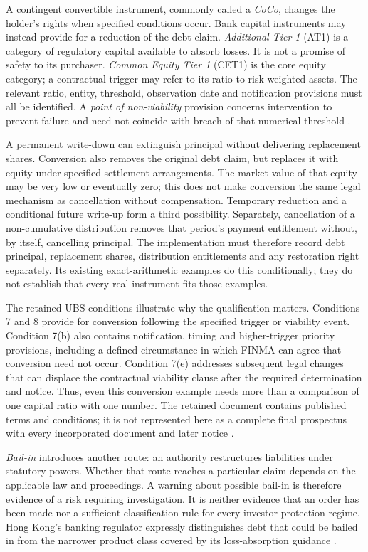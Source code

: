 \documentclass[12pt,a4paper,oneside,openany]{book}
\begin{document}
A contingent convertible instrument, commonly called a \emph{CoCo}, changes the
holder's rights when specified conditions occur. Bank capital instruments may
instead provide for a reduction of the debt claim. \emph{Additional Tier 1}
(AT1) is a category of regulatory capital available to absorb losses. It is not
a promise of safety to its purchaser. \emph{Common Equity Tier 1} (CET1) is the
core equity category; a contractual trigger may refer to its ratio to
risk-weighted assets. The relevant ratio, entity, threshold, observation date
and notification provisions must all be identified. A \emph{point of
non-viability} provision concerns intervention to prevent failure and need not
coincide with breach of that numerical threshold
\citep[arts.~27, 27a and 29]{swisscao2025}.

A permanent write-down can extinguish principal without delivering replacement
shares. Conversion also removes the original debt claim, but replaces it with
equity under specified settlement arrangements. The market value of that equity
may be very low or eventually zero; this does not make conversion the same legal
mechanism as cancellation without compensation. Temporary reduction and a
conditional future write-up form a third possibility. Separately, cancellation
of a non-cumulative distribution removes that period's payment entitlement
without, by itself, cancelling principal. The implementation must therefore
record debt principal, replacement shares, distribution entitlements and any
restoration right separately. Its existing exact-arithmetic examples do this
conditionally; they do not establish that every real instrument fits those
examples.

The retained UBS conditions illustrate why the qualification matters. Conditions
7 and 8 provide for conversion following the specified trigger or viability
event. Condition 7(b) also contains notification, timing and higher-trigger
priority provisions, including a defined circumstance in which FINMA can agree
that conversion need not occur. Condition 7(e) addresses subsequent legal changes
that can displace the contractual viability clause after the required
determination and notice. Thus, even this conversion example needs more than a
comparison of one capital ratio with one number. The retained document contains
published terms and conditions; it is not represented here as a complete final
prospectus with every incorporated document and later notice
\citep[conditions~7--8, PDF pp.~25--29]{ubsat12024}.

\emph{Bail-in} introduces another route: an authority restructures liabilities
under statutory powers. Whether that route reaches a particular claim depends
on the applicable law and proceedings. A warning about possible bail-in is
therefore evidence of a risk requiring investigation. It is neither evidence
that an order has been made nor a sufficient classification rule for every
investor-protection regime. Hong Kong's banking regulator expressly distinguishes
debt that could be bailed in from the narrower product class covered by its
loss-absorption guidance \citep[questions~1--4]{hkmalacfaq2022}.
\end{document}
